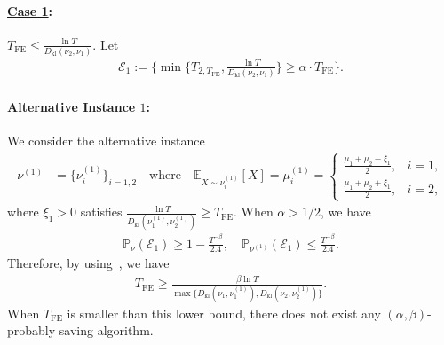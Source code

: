 \documentclass[twoside,11pt]{article}
\newcommand{\kl}{D_{\mathrm{kl}}}
\newcommand{\calE}{\mathcal{E}}
\newcommand{\calN}{\mathcal{N}}
\newcommand{\bbE}{\mathbb{E}}
\newcommand{\bbP}{\mathbb{P}}
\newcommand{\Tfe}{T_{\mathrm{FE}}}
\begin{document}
\paragraph{\textbf{\underline{Case 1}}:} $\Tfe\leq \frac{\ln T}{\kl(\nu_2,\nu_1)}.$
Let 
\begin{align}
    \calE_1 :=\bigg\{\min\Big\{T_{2,\Tfe},\frac{\ln T}{\kl(\nu_2,\nu_1)}\Big\}\geq \alpha\cdot \Tfe\bigg\}.
\end{align}

\paragraph{Alternative Instance $1$:}
We consider the alternative instance 
\begin{align}
\nu^{(1)} 
&= \big\{ \nu_i^{(1)} \big\}_{i=1,2} 
\quad\text{where}\quad \bbE_{X\sim \nu_i^{(1)}}[X]=
\mu_i^{(1)} =
\begin{cases}
\frac{\mu_1+\mu_2-\xi_1}{2}, & i = 1, \\
\frac{\mu_1+\mu_2+\xi_1}{2}, & i = 2,
\end{cases}
\end{align}
where $\xi_1>0$ satisfies $\frac{\ln T}{\kl(\nu_1^{(1)},\nu_2^{(1)})}\geq \Tfe$.
When $\alpha> 1/2$, we have
\begin{align}
    \bbP_{\nu}(\calE_1)\geq 1- \frac{T^{-\beta}}{2.4},\quad
    \bbP_{\nu^{(1)}}(\calE_1)\leq \frac{T^{-\beta}}{2.4}.
\end{align}
Therefore, by using~\citet[Lemma~1]{kaufmann2016complexity}, we have
\begin{align}\label{equ:lowbd_twoarm3}
    \Tfe \geq \frac{\beta\ln T}{ \max\big\{\kl(\nu_1,\nu_1^{(1)}),\kl(\nu_2,\nu_2^{(1)})\big\}} .
\end{align}
When $\Tfe$ is smaller than this lower bound, there does not exist any $(\alpha,\beta)$-probably saving algorithm.
\end{document}
